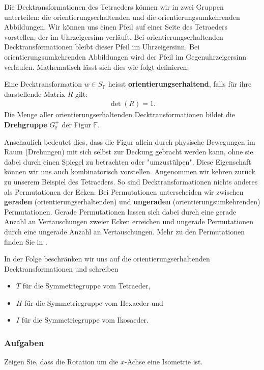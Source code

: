 Die Decktransformationen des Tetraeders können wir in zwei Gruppen unterteilen: die orientierungserhaltenden und die orientierungsumkehrenden Abbildungen. Wir können uns einen Pfeil auf einer Seite des Tetraeders vorstellen, der im Uhrzeigersinn verläuft. Bei orientierungserhaltenden Decktransformationen bleibt dieser Pfeil im Uhrzeigersinn. Bei orientierungsumkehrenden Abbildungen wird der Pfeil im Gegenuhrzeigersinn verlaufen. Mathematisch lässt sich dies wie folgt definieren: 
\begin{definition}
    Eine Decktransformation $w \in S_{\mathbb{F}}$ heisst \textbf{orientierungserhaltend}, falls für ihre darstellende Matrix $R$ gilt:
    \begin{align}
        \det(R) = 1. \nonumber
    \end{align}
    Die Menge aller orientierungserhaltenden Decktransformationen bildet die \textbf{Drehgruppe} $G_{\mathbb{F}}^+$ der Figur $\mathbb{F}$.
\end{definition}
 Anschaulich bedeutet dies, dass die Figur allein durch physische Bewegungen im Raum (Drehungen) mit sich selbst zur Deckung gebracht werden kann, ohne sie dabei durch einen Spiegel zu betrachten oder "umzustülpen". Diese Eigenschaft können wir uns auch kombinatorisch vorstellen. Angenommen wir kehren zurück zu unserem Beispiel des Tetraeders. So sind Decktransformationen nichts anderes als Permutationen der Ecken. Bei Permutationen unterscheiden wir zwischen \textbf{geraden} (orientierungserhaltenden) und \textbf{ungeraden} (orientierungsumkehrenden) Permutationen. Gerade Permutationen lassen sich dabei durch eine gerade Anzahl an Vertauschungen zweier Ecken erreichen und ungerade Permutationen durch eine ungerade Anzahl an Vertauschungen. Mehr zu den Permutationen finden Sie in \cite{hungerbuehler_kombinatorik1}. \newline

In der Folge beschränken wir uns auf die orientierungserhaltenden Decktransformationen und schreiben
\begin{itemize}
    \item $T$ für die Symmetriegruppe vom Tetraeder,
    \item $H$ für die Symmetriegruppe vom Hexaeder und 
    \item $I$ für die Symmetriegruppe vom Ikosaeder.
\end{itemize}

\subsubsection{Aufgaben}
\begin{exercise} \label{ex:rotationisometrie}
    Zeigen Sie, dass die Rotation um die $x$-Achse eine Isometrie ist. 
\end{exercise}

